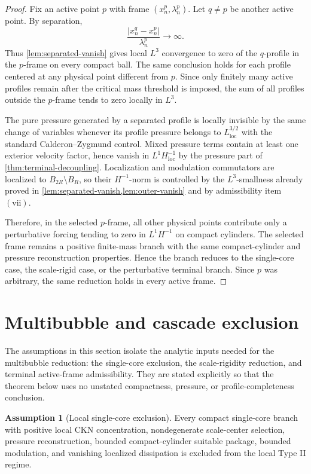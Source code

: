 \documentclass[11pt]{amsart}
\theoremstyle{plain}
\theoremstyle{definition}
\newtheorem{assumption}[theorem]{Assumption}
\theoremstyle{remark}
\begin{document}
\begin{proof}
Fix an active point \(p\) with frame \((x^p_n,\lambda^p_n)\).  Let \(q\ne p\)
be another active point.  By separation,
\[
  \frac{|x^q_n-x^p_n|}{\lambda^p_n}\to\infty.
\]
Thus \cref{lem:separated-vanish} gives local \(L^3\) convergence to zero of the
\(q\)-profile in the \(p\)-frame on every compact ball.  The same conclusion
holds for each profile centered at any physical point different from \(p\).
Since only finitely many active profiles remain after the critical mass
threshold is imposed, the sum of all profiles outside the \(p\)-frame tends to
zero locally in \(L^3\).

The pure pressure generated by a separated profile is locally invisible by the
same change of variables whenever its profile pressure belongs to
\(L^{3/2}_{\mathrm{loc}}\) with the standard Calderon--Zygmund control.  Mixed
pressure terms contain at least one exterior velocity factor, hence vanish in
\(L^1H^{-1}_{\mathrm{loc}}\) by the pressure part of
\cref{thm:terminal-decoupling}.  Localization and modulation commutators are
localized to \(B_{2R}\setminus B_R\), so their \(H^{-1}\)-norm is controlled by
the \(L^3\)-smallness already proved in \cref{lem:separated-vanish,lem:outer-vanish}
and by admissibility item \((\text{vii})\).

Therefore, in the selected \(p\)-frame, all other physical points contribute
only a perturbative forcing tending to zero in \(L^1H^{-1}\) on compact
cylinders.  The selected frame remains a positive finite-mass branch with the
same compact-cylinder and pressure reconstruction properties.  Hence the branch
reduces to the single-core case, the scale-rigid case, or the perturbative
terminal branch.  Since \(p\) was arbitrary, the same reduction holds in every
active frame.
\end{proof}

\section{Multibubble and cascade exclusion}

The assumptions in this section isolate the analytic inputs needed for the
multibubble reduction: the single-core exclusion, the scale-rigidity reduction,
and terminal active-frame admissibility.  They are stated explicitly so that the
theorem below uses no unstated compactness, pressure, or profile-completeness
conclusion.

\begin{assumption}[Local single-core exclusion]\label{ass:single-core}
Every compact single-core branch with positive local CKN concentration,
nondegenerate scale-center selection, pressure reconstruction, bounded
compact-cylinder suitable package, bounded modulation, and vanishing localized
dissipation is excluded from the local Type II regime.
\end{assumption}
\end{document}
